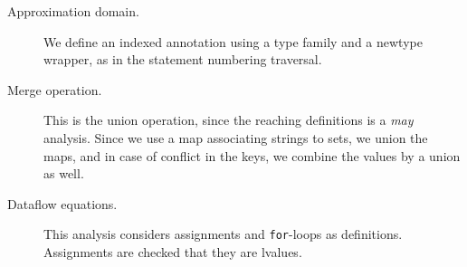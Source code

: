 \documentclass[letterpaper,11pt]{article}
\newcommand{\code}{\texttt}
\begin{document}
\begin{description}
    \item[Approximation domain.]
        We define an indexed annotation using a type family and a newtype
        wrapper, as in the statement numbering traversal.

        

    \item[Merge operation.]
        This is the union operation, since the reaching definitions is a
        \emph{may} analysis. Since we use a map associating strings to sets, we
        union the maps, and in case of conflict in the keys, we combine the
        values by a union as well.

        

    \item[Dataflow equations.]
        This analysis considers assignments and \code{for}-loops as
        definitions. Assignments are checked that they are lvalues.

        


\end{description}
\end{document}
